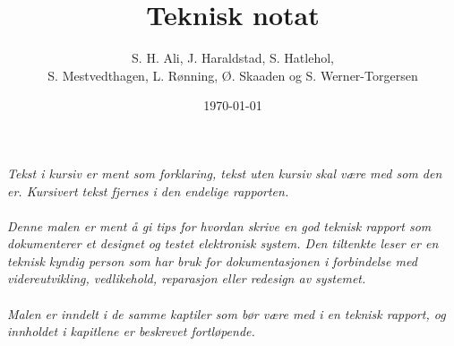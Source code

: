 \documentclass[11pt,norsk]{elsys-teknisk}
\title{Teknisk notat}
\author{S. H. Ali, J. Haraldstad, S. Hatlehol, \\ S. Mestvedthagen, L. Rønning, Ø. Skaaden og S. Werner-Torgersen}
\date{\today}
\begin{document}

\maketitle

\toc


\textit{Tekst i kursiv er ment som forklaring, tekst uten kursiv skal være med som den er. Kursivert tekst fjernes i den endelige rapporten.\\
\\
Denne malen er ment å gi tips for hvordan skrive en god teknisk rapport som dokumenterer et designet og testet elektronisk system. Den tiltenkte leser er en teknisk kyndig person som har bruk for dokumentasjonen i forbindelse med videreutvikling, vedlikehold, reparasjon eller redesign av systemet.\\
\\
Malen er inndelt i de samme kaptiler som bør være med i en teknisk rapport, og innholdet i kapitlene er beskrevet fortløpende.
\cite{bibelen}
}

\newpage
{}


\newpage



\newpage



\newpage



\newpage



\newpage



\newpage


{}

\printbibliography
%
%

\appendix

\end{document}
